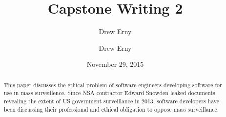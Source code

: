 \documentclass{sig-alternate-05-2015}
\begin{document}
\title{Capstone Writing 2}
\author{Drew Erny}
\date{November 29, 2015}


\author{
  \alignauthor
  Drew Erny
}

\maketitle
\begin{abstract}
This paper discusses the ethical problem of software engineers developing
software for use in mass surveillence. Since NSA contractor Edward Snowden
leaked documents revealing the extent of US government surveillance in 2013,
software developers have been discussing their professional and ethical
obligation to oppose mass surveillance.
\end{abstract}
\end{document}
